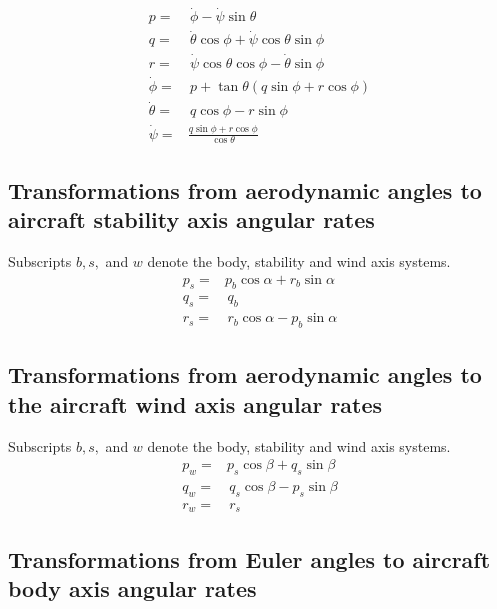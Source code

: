 \documentclass[
]{book}
\begin{document}
\[
\begin{align}
p =& \, \dot{\phi} -\dot{\psi} \sin\theta\\
q =& \, \dot{\theta} \cos\phi + \dot{\psi} \cos{\theta} \sin{\phi}\\
r =& \, \dot{\psi} \cos\theta \cos\phi - \dot{\theta} \sin\phi\\
\dot{\phi} =& \, p + \tan\theta(q \sin\phi + r\cos\phi) \\
\dot{\theta}=& \, q \cos\phi - r\sin\phi\\
\dot{\psi} =& \frac{q \sin\phi + r \cos\phi}{\cos\theta} \, 
\end{align}
\]

\hypertarget{transformations-from-aerodynamic-angles-to-aircraft-stability-axis-angular-rates}{%
\subsection{Transformations from aerodynamic angles to aircraft stability axis angular rates}\label{transformations-from-aerodynamic-angles-to-aircraft-stability-axis-angular-rates}}

Subscripts \(b, s,\) and \(w\) denote the body, stability and wind axis systems.
\[
\begin{align}
p_s =& p_b \cos\alpha + r_b \sin\alpha\, \\
q_s =& \, q_b\\
r_s =& \, r_b \cos\alpha - p_b \sin\alpha
\end{align}
\]

\hypertarget{transformations-from-aerodynamic-angles-to-the-aircraft-wind-axis-angular-rates}{%
\subsection{Transformations from aerodynamic angles to the aircraft wind axis angular rates}\label{transformations-from-aerodynamic-angles-to-the-aircraft-wind-axis-angular-rates}}

Subscripts \(b, s,\) and \(w\) denote the body, stability and wind axis systems.
\[
\begin{align}
p_w =& p_s \cos\beta + q_s \sin\beta\, \\
q_w =& \, q_s \cos\beta - p_s\sin\beta\\
r_w =& \, r_s
\end{align}
\]

\hypertarget{transformations-from-euler-angles-to-aircraft-body-axis-angular-rates}{%
\subsection{Transformations from Euler angles to aircraft body axis angular rates}\label{transformations-from-euler-angles-to-aircraft-body-axis-angular-rates}}
\end{document}
